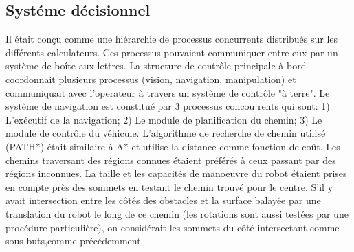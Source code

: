 \subsection{Systéme décisionnel}

Il était conçu comme une hiérarchie de processus concurrents distribués sur les différents calculateurs. Ces processus pouvaient communiquer entre eux par un système de boîte aux lettres. La structure de contrôle principale à bord coordonnait plusieurs processus (vision, navigation, manipulation) et communiquait avec l'operateur à travers un système de contrôle "à terre".
Le système de navigation est constitué par 3 processus concou rents qui sont:
1) L'exécutif de la navigation;
2) Le module de planification du chemin; 3) Le module de contrôle du véhicule.
L'algorithme de recherche de chemin utilisé (PATH*) était similaire à A* et utilise la distance comme fonction de coût. Les chemins traversant des régions connues étaient préférés à ceux passant par des régions inconnues.
La taille et les capacités de manoeuvre du robot étaient prises en compte près des sommets en testant le chemin trouvé pour le centre. S'il y avait intersection entre les côtés des obstacles et la surface balayée par une translation du robot le long de ce chemin (les rotations sont aussi testées par une procédure particulière), on considérait les sommets du côté intersectant comme sous-buts,comme précédemment.
\newpage
